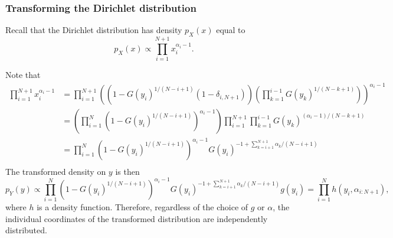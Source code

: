 \begin{appendices}
\subsubsection{Transforming the Dirichlet distribution}

Recall that the Dirichlet distribution has density $p_X(x)$ equal to
\[
p_X(x) \propto \prod_{i=1}^{N+1} x_i^{\alpha_i - 1}.
\]

Note that
\[
\begin{aligned}
\prod_{i=1}^{N+1} x_i^{\alpha_i - 1} &= \prod_{i=1}^{N+1} \left(\left(1-G(y_i)^{1/(N-i+1)}(1 - \delta_{i,N+1})\right)\left(\prod_{k=1}^{i-1} G(y_k)^{1/(N-k+1)}\right)\right)^{\alpha_i - 1}\\
&= \left(\prod_{i=1}^{N} \left(1-G(y_i)^{1/(N-i+1)}\right)^{\alpha_i - 1}\right) \prod_{i=1}^{N+1}\prod_{k=1}^{i-1} G(y_k)^{(\alpha_i - 1)/(N-k+1)}\\
&= \prod_{i=1}^{N} \left(1-G(y_i)^{1/(N-i+1)}\right)^{\alpha_i - 1} G(y_i)^{-1+\sum_{k=i+1}^{N+1}\alpha_k/(N-i+1)}\\
\end{aligned}
\]
The transformed density on $y$ is then
\[
p_Y(y) \propto \prod_{i=1}^{N} \left(1-G(y_i)^{1/(N-i+1)}\right)^{\alpha_i - 1} G(y_i)^{-1+\sum_{k=i+1}^{N+1}\alpha_k/(N-i+1)} g(y_i) = \prod_{i=1}^{N} h(y_i, \alpha_{i:N+1}),
\]
where $h$ is a density function.
Therefore, regardless of the choice of $g$ or $\alpha$, the individual coordinates of the transformed distribution are independently distributed.
\end{appendices}
